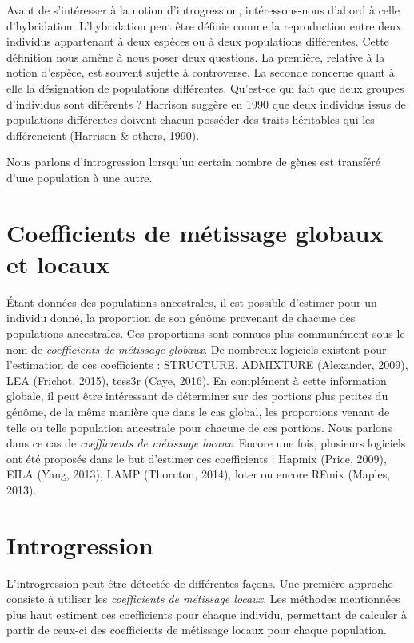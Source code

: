 \documentclass[12pt,twoside]{reedthesis}
\theoremstyle{definition}
\theoremstyle{definition}
\theoremstyle{remark}
\begin{document}
  Avant de s'intéresser à la notion d'introgression, intéressons-nous
  d'abord à celle d'hybridation. L'hybridation peut être définie comme la
  reproduction entre deux individus appartenant à deux espèces ou à deux
  populations différentes. Cette définition nous amène à nous poser deux
  questions. La première, relative à la notion d'espèce, est souvent
  sujette à controverse. La seconde concerne quant à elle la désignation
  de populations différentes. Qu'est-ce qui fait que deux groupes
  d'individus sont différents ? Harrison suggère en 1990 que deux
  individus issus de populations différentes doivent chacun posséder des
  traits héritables qui les différencient (Harrison \& others, 1990).
  
  Nous parlons d'introgression lorsqu'un certain nombre de gènes est
  transféré d'une population à une autre.
  
  \section{Coefficients de métissage globaux et
  locaux}\label{coefficients-de-metissage-globaux-et-locaux}
  
  Étant données des populations ancestrales, il est possible d'estimer
  pour un individu donné, la proportion de son génôme provenant de chacune
  des populations ancestrales. Ces proportions sont connues plus
  communément sous le nom de \emph{coefficients de métissage globaux}. De
  nombreux logiciels existent pour l'estimation de ces coefficients :
  STRUCTURE, ADMIXTURE (Alexander, 2009), LEA (Frichot, 2015), tess3r
  (Caye, 2016). En complément à cette information globale, il peut être
  intéressant de déterminer sur des portions plus petites du génôme, de la
  même manière que dans le cas global, les proportions venant de telle ou
  telle population ancestrale pour chacune de ces portions. Nous parlons
  dans ce cas de \emph{coefficients de métissage locaux}. Encore une fois,
  plusieurs logiciels ont été proposés dans le but d'estimer ces
  coefficients : Hapmix (Price, 2009), EILA (Yang, 2013), LAMP (Thornton,
  2014), loter ou encore RFmix (Maples, 2013).
  
  \section{Introgression}\label{introgression}
  
  L'introgression peut être détectée de différentes façons. Une première
  approche consiste à utiliser les \emph{coefficients de métissage
  locaux}. Les méthodes mentionnées plus haut estiment ces coefficients
  pour chaque individu, permettant de calculer à partir de ceux-ci des
  coefficients de métissage locaux pour chaque population.
  
\end{document}

